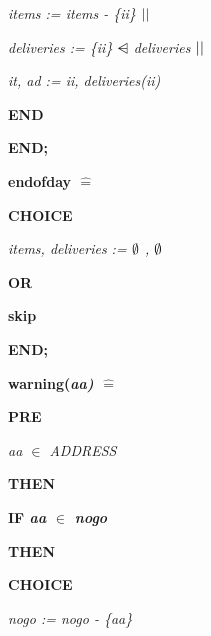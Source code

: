 \documentclass[11pt]{article}
\begin{document}
\begin{sloppypar}
\hspace*{0.60in}\it items \rm := \it items \rm - \rm \{\it ii\rm \}  $\mbox{$\mid\mid$}$ 

\hspace*{0.60in}\it deliveries \rm := \rm \{\it ii\rm \}  $\ndres$  \it deliveries  $\mbox{$\mid\mid$}$ 

\hspace*{0.60in}\it it\rm , \it ad \rm := \it ii\rm , \it deliveries\rm (\it ii\rm )

\hspace*{0.40in}\bf END

\hspace*{0.20in}\bf END\rm ;

\hspace*{0.20in}

\hspace*{0.20in}\bf endofday \rm $\widehat{=}$ 

\hspace*{0.20in}\bf CHOICE

\hspace*{0.40in}\it items\rm , \it deliveries \rm :=  $\emptyset$ \rm ,  $\emptyset$ 

\hspace*{0.20in}\bf OR

\hspace*{0.40in}\bf skip

\hspace*{0.20in}\bf END\rm ;

\hspace*{0.20in}

\hspace*{0.20in}\bf warning\rm (\it aa\rm ) \rm $\widehat{=}$ 

\hspace*{0.20in}\bf PRE

\hspace*{0.40in}\it aa  $\in$  \it ADDRESS

\hspace*{0.20in}\bf THEN

\hspace*{0.40in}\bf IF \it aa  $\in$  \it nogo

\hspace*{0.40in}\bf THEN

\hspace*{0.60in}\bf CHOICE

\hspace*{0.80in}\it nogo \rm := \it nogo \rm - \rm \{\it aa\rm \} 


\end{sloppypar}
\end{document}
